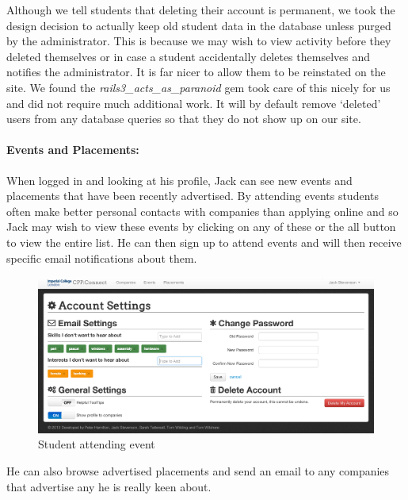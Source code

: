     Although we tell students that deleting their account is permanent, we took the design decision to actually keep old student data in the database unless purged by the administrator. This is because we may wish to view activity before they deleted themselves or in case a student accidentally deletes themselves and notifies the administrator. It is far nicer to allow them to be reinstated on the site. We found the \textit{rails3\_acts\_as\_paranoid}\cite{paranoid_gem} gem took care of this nicely for us and did not require much additional work. It will by default remove `deleted' users from any database queries so that they do not show up on our site.

  \paragraph{Events and Placements:}
    When logged in and looking at his profile, Jack can see new events and placements that have been recently advertised. By attending events students often make better personal contacts with companies than applying online and so Jack may wish to view these events by clicking on any of these or the all button to view the entire list. He can then sign up to attend events and will then receive specific email notifications about them.

    \begin{figure}[H]\centering
    \includegraphics[scale=0.3]{images/user_experiences/student/account_settings}
    \caption{Student attending event}
    \end{figure}

    He can also browse advertised placements and send an email to any companies that advertise any he is really keen about.

